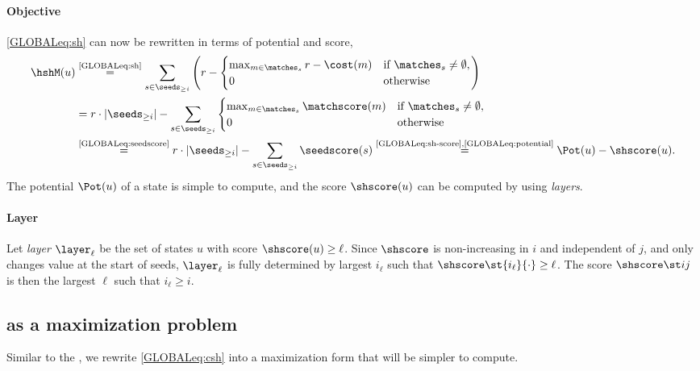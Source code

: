 \paragraph{Objective}
\cref{GLOBALeq:sh} can now be rewritten in terms of potential
and score,
\begin{align}
  \hshM(u)
  &\stackrel{\text{\eqref{GLOBALeq:sh}}}= \sum_{s\in \seeds_{\geq i}}\left(r-\begin{cases}
    \max_{m\in \matches_s} r-\cost(m) &\text{if $\matches_s \neq \emptyset$}, \\
    0 &\text{otherwise}
  \end{cases}\right)\nonumber\\
  &= r\cdot |\seeds_{\geq i}| -
   \sum_{s\in \seeds_{\geq i}}\begin{cases}
    \max_{m\in \matches_s} \matchscore(m) &\text{if $\matches_s \neq \emptyset$}, \\
    0 &\text{otherwise}
  \end{cases}\nonumber\\
  &\stackrel{\text{\eqref{GLOBALeq:seedscore}}}{=} r\cdot |\seeds_{\geq i}| - \sum_{s\in \seeds_{\geq i}} \seedscore(s)
  \stackrel{\text{\eqref{GLOBALeq:sh-score},\eqref{GLOBALeq:potential}}}{=}\Pot(u) - \shscore(u).
  \label{GLOBALeq:sh-computation}
\end{align}
The potential $\Pot(u)$ of a state is simple to compute, and the score
$\shscore(u)$ can be computed by using \emph{layers}.

\paragraph{Layer}
Let \emph{layer} $\layer_\ell$ be the set of states $u$ with score
$\shscore(u) \geq \ell$.
Since $\shscore$ is non-increasing in $i$ and independent of $j$, and only
changes value at the start of seeds, $\layer_\ell$ is fully
determined by largest $i_\ell$ such that $\shscore\st {i_\ell}{{\cdot}} \geq \ell$.
The score $\shscore\st ij$ is then the largest $\ell$ such that $i_\ell \geq i$.


\subsection{\Csh as a maximization problem} \label{GLOBALsec:formulas-csh}

Similar to the \sh, we rewrite \cref{GLOBALeq:csh} into a maximization form that will be simpler to compute.

